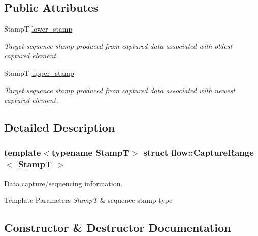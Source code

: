 \subsection*{Public Attributes}
\begin{DoxyCompactItemize}
\item 
\mbox{\label{structflow_1_1_capture_range_ab0f90a505b277b3ca9b1f72bd8097859}} 
StampT \hyperlink{structflow_1_1_capture_range_ab0f90a505b277b3ca9b1f72bd8097859}{lower\+\_\+stamp}
\begin{DoxyCompactList}\small\item\em Target sequence stamp produced from captured data associated with oldest captured element. \end{DoxyCompactList}\item 
\mbox{\label{structflow_1_1_capture_range_a08e561c0c45af5a2890f00971a20b7f4}} 
StampT \hyperlink{structflow_1_1_capture_range_a08e561c0c45af5a2890f00971a20b7f4}{upper\+\_\+stamp}
\begin{DoxyCompactList}\small\item\em Target sequence stamp produced from captured data associated with newest captured element. \end{DoxyCompactList}\end{DoxyCompactItemize}


\subsection{Detailed Description}
\subsubsection*{template$<$typename StampT$>$\newline
struct flow\+::\+Capture\+Range$<$ Stamp\+T $>$}

Data capture/sequencing information. 


\begin{DoxyTemplParams}{Template Parameters}
{\em StampT} & sequence stamp type \\
\hline
\end{DoxyTemplParams}


\subsection{Constructor \& Destructor Documentation}
\mbox{\label{structflow_1_1_capture_range_a525dd2f7119611ebdf7d02f2a5a15af9}} 
